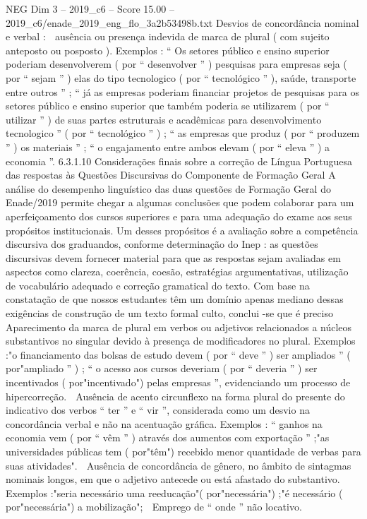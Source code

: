 \begin{textsample}{NEG Dim 3 – 2019\_c6 – Score 15.00 – 2019\_c6/enade\_2019\_eng\_flo\_3a2b53498b.txt}
Desvios de concordância nominal e verbal :  ausência ou presença indevida de marca de plural ( com sujeito anteposto ou posposto ).
Exemplos : “ Os setores público e ensino superior poderiam desenvolverem ( por “ desenvolver ” ) pesquisas para empresas seja ( por “ sejam ” ) elas do tipo tecnologico ( por “ tecnológico ” ), saúde, transporte entre outros ” ; “ já as empresas poderiam financiar projetos de pesquisas para os setores público e ensino superior que também poderia se utilizarem ( por “ utilizar ” ) de suas partes estruturais e acadêmicas para desenvolvimento tecnologico ” ( por “ tecnológico ” ) ; “ as empresas que produz ( por “ produzem ” ) os materiais ” ; “ o engajamento entre ambos elevam ( por “ eleva ” ) a economia ”. 6.3.1.10 Considerações finais sobre a correção de Língua Portuguesa das respostas às Questões Discursivas do Componente de Formação Geral A análise do desempenho linguístico das duas questões de Formação Geral do Enade/2019 permite chegar a algumas conclusões que podem colaborar para um aperfeiçoamento dos cursos superiores e para uma adequação do exame aos seus propósitos institucionais.
Um desses propósitos é a avaliação sobre a competência discursiva dos graduandos, conforme determinação do Inep : as questões discursivas devem fornecer material para que as respostas sejam avaliadas em aspectos como clareza, coerência, coesão, estratégias argumentativas, utilização de vocabulário adequado e correção gramatical do texto.
Com base na constatação de que nossos estudantes têm um domínio apenas mediano dessas exigências de construção de um texto formal culto, conclui -se que é preciso  Aparecimento da marca de plural em verbos ou adjetivos relacionados a núcleos substantivos no singular devido à presença de modificadores no plural.
Exemplos :"o financiamento das bolsas de estudo devem ( por “ deve ” ) ser ampliados ” ( por"ampliado ” ) ; “ o acesso aos cursos deveriam ( por “ deveria ” ) ser incentivados ( por"incentivado") pelas empresas ”, evidenciando um processo de hipercorreção.  Ausência de acento circunflexo na forma plural do presente do indicativo dos verbos “ ter ” e “ vir ”, considerada como um desvio na concordância verbal e não na acentuação gráfica.
Exemplos : “ ganhos na economia vem ( por “ vêm ” ) através dos aumentos com exportação ” ;"as universidades públicas tem ( por"têm") recebido menor quantidade de verbas para suas atividades".  Ausência de concordância de gênero, no âmbito de sintagmas nominais longos, em que o adjetivo antecede ou está afastado do substantivo.
Exemplos :"seria necessário uma reeducação"( por"necessária") ;"é necessário ( por"necessária") a mobilização";  Emprego de “ onde ” não locativo.

\end{textsample}
